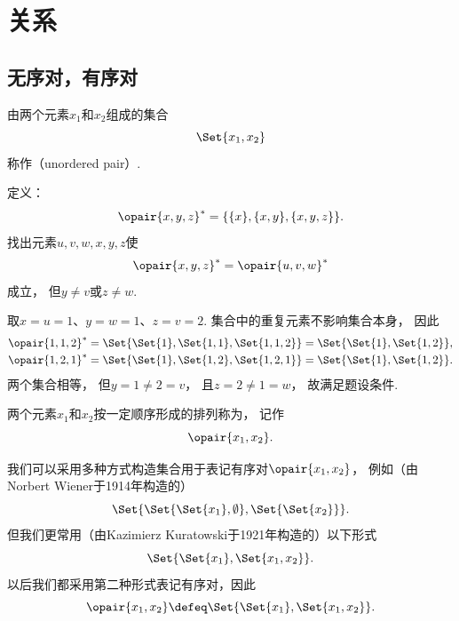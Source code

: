 \section{关系}
\subsection{无序对，有序对}
\begin{definition}
    由两个元素\(x_1\)和\(x_2\)组成的集合
    \begin{equation*}
        \Set{x_1, x_2}
    \end{equation*}
    称作（unordered pair）.
\end{definition}

\begin{example}
    定义：
    \begin{equation*}
        \opair{x,y,z}^* = \{\{x\},\{x,y\},\{x,y,z\}\}.
    \end{equation*}
    找出元素\(u,v,w,x,y,z\)使
    \begin{equation*}
        \opair{x,y,z}^* = \opair{u,v,w}^*
    \end{equation*}
    成立，
    但\(y \neq v\)或\(z \neq w\).
    \begin{solution}
        取\(x=u=1\)、\(y=w=1\)、\(z=v=2\).
        集合中的重复元素不影响集合本身，
        因此
        \begin{align*}
            \opair{1,1,2}^*
            &= \Set{\Set{1},\Set{1,1},\Set{1,1,2}}
            = \Set{\Set{1},\Set{1,2}}, \\
            \opair{1,2,1}^*
            &= \Set{\Set{1},\Set{1,2},\Set{1,2,1}}
            = \Set{\Set{1},\Set{1,2}}.
        \end{align*}
        两个集合相等，
        但\(y=1\neq2=v\)，
        且\(z=2\neq1=w\)，
        故满足题设条件.
    \end{solution}
\end{example}

\begin{definition}
    两个元素\(x_1\)和\(x_2\)按一定顺序形成的排列称为，
    记作
    \begin{equation*}
        \opair{x_1,x_2}.
    \end{equation*}

    我们可以采用多种方式构造集合用于表记有序对\(\opair{x_1,x_2}\)，
    例如（由Norbert Wiener于1914年构造的）
    \begin{equation*}
        \Set{ \Set{ \Set{x_1}, \emptyset }, \Set{ \Set{ x_2 } } }.
    \end{equation*}
    但我们更常用（由Kazimierz Kuratowski于1921年构造的）以下形式
    \begin{equation*}
        \Set{ \Set{x_1}, \Set{x_1, x_2} }.
    \end{equation*}
    以后我们都采用第二种形式表记有序对，因此
    \begin{equation*}
        \opair{x_1,x_2}
        \defeq
        \Set{ \Set{x_1}, \Set{x_1, x_2} }.
    \end{equation*}
\end{definition}

